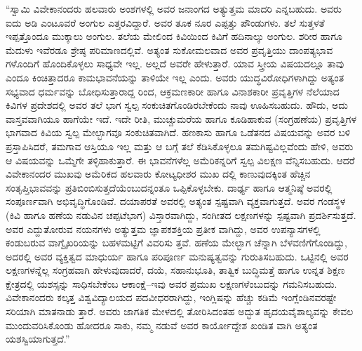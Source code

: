 “ಸ್ವಾಮಿ ವಿವೇಕಾನಂದರು ಹಲವಾರು ಅಂಶಗಳಲ್ಲಿ ಅವರ ಜನಾಂಗದ ಅತ್ಯುತ್ತಮ ಮಾದರಿ ಎನ್ನಬಹುದು. ಅವರು ಐದು ಅಡಿ ಎಂಟೂವರೆ ಅಂಗುಲ ಎತ್ತರವಿದ್ದಾರೆ. ಅವರ ತೂಕ ನೂರ ಎಪ್ಪತ್ತು ಪೌಂಡುಗಳು. ತಲೆ ಸುತ್ತಳತೆ ಇಪ್ಪತ್ತೊಂದೂ ಮುಕ್ಕಾಲು ಅಂಗುಲ. ತಲೆಯ ಮೇಲಿಂದ ಕಿವಿಯಿಂದ ಕಿವಿಗೆ ಹದಿನಾಲ್ಕು ಅಂಗುಲ. ಶರೀರ ಹಾಗೂ ಮೆದುಳು ಇವೆರಡೂ ಶ್ರೇಷ್ಠ ಪರಿಮಾಣದಲ್ಲಿವೆ. ಅತ್ಯಂತ ಸುಕೋಮಲವಾದ ಅವರ ಪ್ರವೃತ್ತಿಯು ದಾಂಪತ್ಯಭಾವ ಗಳೊಂದಿಗೆ ಹೊಂದಿಕೊಳ್ಳಲು ಸಾಧ್ಯವೇ ಇಲ್ಲ. ಅಲ್ಲದೆ ಅವರೇ ಹೇಳುತ್ತಾರೆ. ಯಾವ ಸ್ತ್ರೀಯ ವಿಷಯದಲ್ಲೂ ತಾವು ಎಂದೂ ಕಿಂಚಿತ್ತಾದರೂ ಕಾಮಭಾವನೆಯನ್ನು ತಾಳಿಯೇ ಇಲ್ಲ ಎಂದು. ಅವರು ಯುದ್ಧವಿರೋಧಿಗಳಾಗಿದ್ದು ಅತ್ಯಂತ ಸಭ್ಯವಾದ ಧರ್ಮವನ್ನು ಬೋಧಿಸುತ್ತಾರಾದ್ದ ರಿಂದ, ಆಕ್ರಮಣಕಾರೀ ಹಾಗೂ ವಿನಾಶಕಾರೀ ಪ್ರವೃತ್ತಿಗಳ ನೆಲೆಯಾದ ಕಿವಿಗಳ ಪ್ರದೇಶದಲ್ಲಿ ಅವರ ತಲೆ ಭಾಗ ಸ್ವಲ್ಪ ಸಂಕುಚಿತಗೊಂಡಿರಬೇಕೆಂದು ನಾವು ಊಹಿಸಬಹುದು. ಹೌದು, ಅದು ವಾಸ್ತವವಾಗಿಯೂ ಹಾಗೆಯೇ ಇದೆ. ಇದೇ ರೀತಿ, ಮುಚ್ಚುಮರೆಯ ಹಾಗೂ ಕೂಡಿಹಾಕುವ (ಸಂಗ್ರಹಣೆಯ) ಪ್ರವೃತ್ತಿಗಳ ಭಾಗವಾದ ಕಿವಿಯ ಸ್ವಲ್ಪ ಮೇಲ್ಭಾಗವೂ ಸಂಕುಚಿತವಾಗಿದೆ. ಹಣಕಾಸು ಹಾಗೂ ಒಡೆತನದ ವಿಷಯವನ್ನು ಅವರ ಬಳಿ ಪ್ರಸ್ತಾಪಿಸಿದರೆ, ತಮಗಾವ ಆಸ್ತಿಯೂ ಇಲ್ಲ ಮತ್ತು ಆ ಬಗ್ಗೆ ತಲೆ ಕೆಡಿಸಿಕೊಳ್ಳಲೂ ತಮಗಿಷ್ಟವಿಲ್ಲವೆಂದು ಹೇಳಿ, ಅವರು ಆ ವಿಷಯವನ್ನು ಒಮ್ಮೆಗೇ ತಳ್ಳಿಹಾಕುತ್ತಾರೆ. ಈ ಭಾವನೆಗಳೆಲ್ಲ ಅಮೆರಿಕನ್ನರಿಗೆ ಸ್ವಲ್ಪ ವಿಲಕ್ಷಣ ವೆನ್ನಿಸಬಹುದು. ಆದರೆ ವಿವೇಕಾನಂದರ ಮುಖವು ಅಮೆರಿಕದ ಹಲವಾರು ಕೋಟ್ಯಧೀಶರ ಮುಖ ದಲ್ಲಿ ಕಾಣುವುದಕ್ಕಿಂತ ಹೆಚ್ಚಿನ ಸಂತೃಪ್ತಿಭಾವವನ್ನು ಪ್ರತಿಬಿಂಬಿಸುತ್ತದೆಯೆಂಬುದನ್ನಂತೂ ಒಪ್ಪಿಕೊಳ್ಳಬೇಕು. ದಾರ್ಢ್ಯ ಹಾಗೂ ಆತ್ಮನಿಷ್ಠೆ ಅವರಲ್ಲಿ ಸಂಪೂರ್ಣವಾಗಿ ಅಭಿವೃದ್ಧಿಗೊಂಡಿವೆ. ದಯಾಪರತೆ ಅವರಲ್ಲಿ ಅತ್ಯಂತ ಸ್ಪಷ್ಟವಾಗಿ ವ್ಯಕ್ತವಾಗುತ್ತದೆ. ಅವರ ಗಂಡಸ್ಥಳ (ಕಿವಿ ಹಾಗೂ ಹಣೆಯ ನಡುವಿನ ಚಪ್ಪಟೆಭಾಗ) ವಿಸ್ತಾರವಾಗಿದ್ದು, ಸಂಗೀತದ ಲಕ್ಷಣಗಳನ್ನು ಸ್ಪಷ್ಟವಾಗಿ ಪ್ರದರ್ಶಿಸುತ್ತದೆ. ಅವರ ಎದ್ದುತೋರುವ ನಯನಗಳು ಅತ್ಯುತ್ತಮ ಜ್ಞಾಪಕಶಕ್ತಿಯ ಪ್ರತೀಕ ವಾಗಿದ್ದು, ಅವರ ಉಪನ್ಯಾಸಗಳಲ್ಲಿ ಕಂಡುಬರುವ ವಾಗ್ವೈಖರಿಯನ್ನು ಬಹಳಮಟ್ಟಿಗೆ ವಿವರಿಸು ತ್ತವೆ. ಹಣೆಯ ಮೇಲ್ಭಾಗ ಚೆನ್ನಾಗಿ ಬೆಳವಣಿಗೆಗೊಂಡಿದ್ದು, ಅದರಲ್ಲಿ ಅವರ ವ್ಯಕ್ತಿತ್ವದ ಮಾಧುರ್ಯ ಹಾಗೂ ಪರಿಪೂರ್ಣ ಮನುಷ್ಯತ್ವವನ್ನು ಗುರುತಿಸಬಹುದು. ಒಟ್ಟಿನಲ್ಲಿ ಅವರ ಲಕ್ಷಣಗಳನ್ನೆಲ್ಲ ಸಂಗ್ರಹವಾಗಿ ಹೇಳುವುದಾದರೆ, ದಯೆ, ಸಹಾನುಭೂತಿ, ತಾತ್ವಿಕ ಬುದ್ಧಿಮತ್ತೆ ಹಾಗೂ ಉನ್ನತ ಶಿಕ್ಷಣ ಕ್ಷೇತ್ರದಲ್ಲಿ ಯಶಸ್ಸನ್ನು ಸಾಧಿಸಬೇಕೆಂಬ ಆಕಾಂಕ್ಷೆ–ಇವು ಅವರ ಪ್ರಮುಖ ಲಕ್ಷಣಗಳೆಂಬುದನ್ನು ಗಮನಿಸಬಹುದು. ವಿವೇಕಾನಂದರು ಕಲ್ಕತ್ತ ವಿಶ್ವವಿದ್ಯಾಲಯದ ಪದವೀಧರರಾಗಿದ್ದು, ಇಂಗ್ಲಿಷನ್ನು ಹೆಚ್ಚು ಕಡಿಮೆ ಇಂಗ್ಲೆಂಡಿನವರಷ್ಟೇ ಸರಿಯಾಗಿ ಮಾತನಾಡು ತ್ತಾರೆ. ಅವರು ಜಾಗತಿಕ ಮೇಳದಲ್ಲಿ ತೋರಿಸಿದಂತಹ ಅದ್ಭುತ ಹೃದಯವೈಶಾಲ್ಯವನ್ನು ಕೇವಲ ಮುಂದುವರಿಸಿಕೊಂಡು ಹೋದರೂ ಸಾಕು, ನಮ್ಮ ನಡುವೆ ಅವರ ಕಾರ್ಯೋದ್ದೇಶ ಖಂಡಿತ ವಾಗಿ ಅತ್ಯಂತ ಯಶಸ್ವಿಯಾಗುತ್ತದೆ.”

